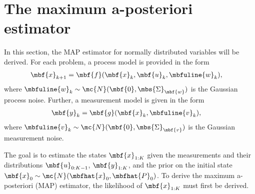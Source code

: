 \section{The maximum a-posteriori estimator}
In this section, the MAP estimator for normally distributed variables will be derived. For each problem, a process model is provided in the form 
\begin{align}
\mbf{x}_{k+1} &= \mbf{f}(\mbf{x}_{k}, \mbf{u}_{k}, \mbfuline{w}_{k}),
\end{align}
where $\mbfuline{w}_{k}\sim\mc{N}(\mbf{0},\mbs{\Sigma}_{\mbf{w}})$ is the Gaussian process noise.
Further, a measurement model is given in the form
\begin{align}
\mbf{y}_{k} &= \mbf{g}(\mbf{x}_{k}, \mbfuline{v}_{k}),
\end{align}
where $\mbfuline{v}_{k}\sim\mc{N}(\mbf{0},\mbs{\Sigma}_{\mbf{v}})$ is the Gaussian measurement noise. 

The goal is to estimate the states $\mbf{x}_{1:K}$ given the measurements and their distributions $\mbf{u}_{0:K-1}$, $\mbf{y}_{1:K}$, and the prior on the initial state $\mbf{x}_{0}\sim\mc{N}(\mbfhat{x}_{0},\mbfhat{P}_{0})$. To derive the maximum a-posteriori (MAP) estimator, the likelihood of $\mbf{x}_{1:K}$ must first be derived. 

